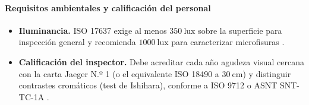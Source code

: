 \paragraph{Requisitos ambientales y calificación del personal}

\begin{itemize}
  \item \textbf{Iluminancia.} ISO 17637 exige al menos $350\ \text{lux}$ sobre la
        superficie para inspección general y recomienda $1000\ \text{lux}$ para
        caracterizar microfisuras \parencite{iso17637}.
  \item \textbf{Calificación del inspector.} Debe acreditar cada año agudeza visual
        cercana con la carta Jaeger N.º 1 (o el equivalente ISO 18490 a
        $30\ \text{cm}$) y distinguir contrastes cromáticos (test de Ishihara),
        conforme a ISO 9712 o ASNT SNT-TC-1A \parencite{iso9712}.
\end{itemize}

